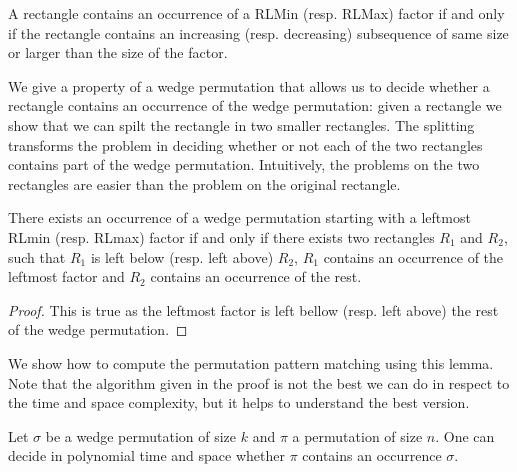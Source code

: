 \documentclass[a4paper]{llncs}
\begin{document}
\begin{remark}
A rectangle contains
an occurrence of a RLMin (resp. RLMax) factor if and only if
the rectangle contains an increasing (resp. decreasing) subsequence
of same size or larger than the size of the factor.
\end{remark}

We give a property of a wedge permutation that
allows us to decide whether a rectangle
contains an occurrence of the wedge permutation:
given a rectangle we show that we can spilt the
rectangle in two smaller rectangles.
The splitting transforms the problem
in deciding whether or not each of the two rectangles
contains part of the wedge permutation.
Intuitively, the problems on the two rectangles
are easier than the problem on the original rectangle.

\begin{lemma}
There exists an occurrence of a wedge permutation
starting with a leftmost RLmin (resp. RLmax) factor
if and only if
there exists two rectangles $R_1$ and $R_2$,
such that $R_1$ is left below (resp. left above) $R_2$,
$R_1$ contains an occurrence of the leftmost factor
and $R_2$ contains an occurrence of the rest.
\end{lemma}

\begin{proof}
This is true as the leftmost factor is left bellow (resp. left above)
the rest of the wedge permutation.
\end{proof}

We show how to compute the permutation pattern matching
using this lemma. Note that the algorithm given in the proof is not the best we can do
in respect to the time and space complexity,
but it helps to understand the best version.

\begin{lemma}
Let $\sigma$ be a wedge permutation of size $k$
and $\pi$ a permutation of size $n$.
One can decide in polynomial time and space whether
$\pi$ contains an occurrence $\sigma$.
\end{lemma}
\end{document}
